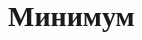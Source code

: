 \documentclass[11pt]{article} %
\DeclareMathOperator{\Var}{Var}
\DeclareMathOperator{\E}{E}
\begin{document}
\begin{comment}
Найдите
\begin{enumerate}
\item $f_{Y}(y)$,
\item $f_{X|Y}\left(x|\frac{1}{2}\right)$
\item $\E\left(X|Y = \frac{1}{2}\right)$
\item $\Var\left(X|Y = \frac{1}{2}\right)$
\end{enumerate}

\end{enumerate}



\newpage
\end{comment}


\section{Минимум}


\end{document}
